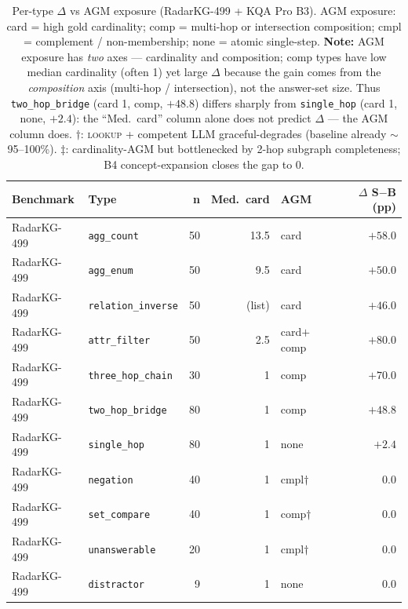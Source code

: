 \documentclass[review]{elsarticle}
\newcommand{\qtype}[1]{\texttt{\small #1}}
\newcommand{\op}[1]{\textsc{\small #1}}
\begin{document}
\begin{table}[t]
\centering
\small
\caption{Per-type $\Delta$ vs AGM exposure (RadarKG-499 + KQA Pro B3). AGM exposure: \textsf{card} = high gold cardinality; \textsf{comp} = multi-hop or intersection composition; \textsf{cmpl} = complement / non-membership; \textsf{none} = atomic single-step. \textbf{Note:} AGM exposure has \emph{two} axes --- cardinality and composition; \textsf{comp} types have low median cardinality (often 1) yet large $\Delta$ because the gain comes from the \emph{composition} axis (multi-hop / intersection), not the answer-set size. Thus \qtype{two\_hop\_bridge} (card 1, \textsf{comp}, $+48.8$) differs sharply from \qtype{single\_hop} (card 1, \textsf{none}, $+2.4$): the ``Med.\ card'' column alone does not predict $\Delta$ --- the AGM column does. $\dagger$: \op{lookup} + competent LLM graceful-degrades (baseline already $\sim$95--100\%). $\ddagger$: cardinality-AGM but bottlenecked by 2-hop subgraph completeness; B4 concept-expansion closes the gap to 0.}
\label{tab:agm}
\setlength{\tabcolsep}{5pt}
\begin{tabular}{l l r r l r}
\toprule
\textbf{Benchmark} & \textbf{Type} & \textbf{n} & \textbf{Med.\ card} & \textbf{AGM} & \textbf{$\Delta$ S$-$B (pp)} \\
\midrule
RadarKG-499 & \qtype{agg\_count}        & 50 & 13.5 & card       & $\mathbf{+58.0}$ \\
RadarKG-499 & \qtype{agg\_enum}         & 50 &  9.5 & card       & $\mathbf{+50.0}$ \\
RadarKG-499 & \qtype{relation\_inverse} & 50 & (list) & card     & $\mathbf{+46.0}$ \\
RadarKG-499 & \qtype{attr\_filter}      & 50 &  2.5 & card$+$comp & $\mathbf{+80.0}$ \\
RadarKG-499 & \qtype{three\_hop\_chain} & 30 &   1  & comp       & $\mathbf{+70.0}$ \\
RadarKG-499 & \qtype{two\_hop\_bridge}  & 80 &   1  & comp       & $\mathbf{+48.8}$ \\
RadarKG-499 & \qtype{single\_hop}       & 80 &   1  & none       & $+2.4$ \\
RadarKG-499 & \qtype{negation}          & 40 &   1  & cmpl$\dagger$ & $0.0$ \\
RadarKG-499 & \qtype{set\_compare}      & 40 &   1  & comp$\dagger$ & $0.0$ \\
RadarKG-499 & \qtype{unanswerable}      & 20 &   1  & cmpl$\dagger$ & $0.0$ \\
RadarKG-499 & \qtype{distractor}        &  9 &   1  & none       & $0.0$ \\

\end{tabular}
\end{table}
\end{document}
